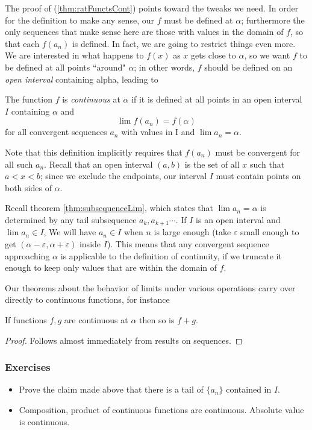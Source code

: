 The proof of  (\ref{thm:ratFunctsCont}) points toward the tweaks we need. In order for the definition to make any sense, our  $f$ must be defined at $\alpha$; furthermore the only sequences that make sense here are those with values in the domain of $f$, so that each $f(a_n)$ is defined. In fact, we are going to restrict things even more. We are interested in what happens to $f(x)$ as $x$ gets close to $\alpha$, so we want $f$ to be defined at all points ``around" $\alpha$; in other words, $f$ should be defined on an \emph{open interval} containing alpha, leading to

\begin{defn}\label{def:continuity}
The function $f$ is \emph{continuous} at $\alpha$ if it is defined at all points in an open interval $I$ containing $\alpha$ and 
\[\lim f(a_n) = f(\alpha)\]
for all convergent sequences $a_n$ with values in I and $\lim a_n = \alpha$.
\end{defn}
Note that this definition implicitly requires that $f(a_n)$ must be convergent for all such $a_n$. Recall that an open interval $(a,b)$ is the set of all $x$ such that $a < x < b$; since we exclude the endpoints, our interval $I$ must contain points on both sides of $\alpha$.

Recall theorem \ref{thm:subsequenceLim}, which states that $\lim a_n = \alpha$ is determined by any tail subsequence $a_k, a_{k+1} \cdots$. If $I$ is an open interval and $\lim a_n \in I$, We will have $a_n \in I$ when $n$ is large enough (take $\varepsilon$ small enough to get $(\alpha-\varepsilon,\alpha+\varepsilon)$ inside $I$). This means that any convergent sequence approaching $\alpha$ is applicable to the definition of continuity, if we truncate it enough to keep only values that are within the domain of $f$.

Our theorems about the behavior of limits under various operations carry over directly to continuous functions, for instance

\begin{thm}\label{thm:sumOfCont}
If functions $f,g$ are continuous at $\alpha$ then so is $f+g$.
\end{thm}
\begin{proof} Follows almost immediately from results on sequences. \end{proof}

\subsubsection{Exercises}
\begin{itemize}
\item Prove the claim made above that there is a tail of $\{a_n\}$ contained in $I$.
\item Composition, product of continuous functions are continuous. Absolute value is continuous.
\end{itemize}


